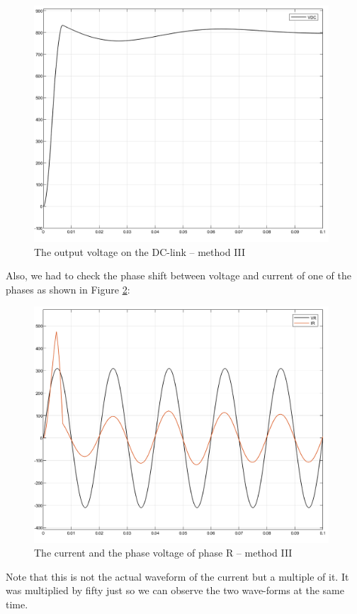 \documentclass[12pt,a4paper]{book}
\begin{document}
\begin{figure}[h!]
  \centering
  \includegraphics[width=11cm]{image24.png}
  \caption{The output voltage on the DC-link -- method III}
  \label{fig:image24}
\end{figure}
Also, we had to check the phase shift between voltage and current of one of the phases as shown in Figure \ref{fig:image25}:

\begin{figure}[h!]
  \centering
  \includegraphics[width=11cm]{image25.png}
  \caption{The current and the phase voltage of phase R -- method III}
  \label{fig:image25}
\end{figure}
Note that this is not the actual waveform of the current but a multiple of it. It was multiplied by fifty just so we can observe the two wave-forms at the same time.
\end{document}
